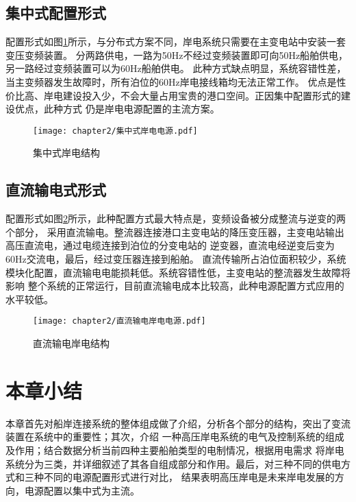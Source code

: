 \subsection{集中式配置形式}

配置形式如图\ref{fig:集中式岸电结构}所示，与分布式方案不同，岸电系统只需要在主变电站中安装一套变压变频装置。
分两路供电，一路为50Hz不经过变频装置即可向50Hz船舶供电，另一路经过变频装置可以为60Hz船舶供电。
此种方式缺点明显，系统容错性差，当主变频器发生故障时，所有泊位的60Hz岸电接线箱均无法正常工作。
优点是性价比高、岸电建设投入少，不会大量占用宝贵的港口空间。正因集中配置形式的建设优点，此种方式
仍是岸电电源配置的主流方案。

\begin{figure}[!htp]
	\centering
	\texttt{[image: chapter2/集中式岸电电源.pdf]}
	\caption{集中式岸电结构}
	\label{fig:集中式岸电结构}
\end{figure}

\subsection{直流输电式形式}

配置形式如图\ref{fig:直流输电岸电结构}所示，此种配置方式最大特点是，变频设备被分成整流与逆变的两个部分，
采用直流输电。整流器连接港口主变电站的降压变压器，主变电站输出高压直流电，通过电缆连接到泊位的分变电站的
逆变器，直流电经逆变后变为60Hz交流电，最后，经过变压器连接到船舶。
直流传输所占泊位面积较少，系统模块化配置，直流输电电能损耗低。系统容错性低，主变电站的整流器发生故障将影响
整个系统的正常运行，目前直流输电成本比较高，此种电源配置方式应用的水平较低。

\begin{figure}[!htp]
	\centering
	\texttt{[image: chapter2/直流输电岸电电源.pdf]}
	\caption{直流输电岸电结构}
	\label{fig:直流输电岸电结构}
\end{figure}

\section{本章小结}

本章首先对船岸连接系统的整体组成做了介绍，分析各个部分的结构，突出了变流装置在系统中的重要性；其次，介绍
一种高压岸电系统的电气及控制系统的组成及作用；结合数据分析当前四种主要船舶类型的电制情况，根据用电需求
将岸电系统分为三类，并详细叙述了其各自组成部分和作用。最后，对三种不同的供电方式和三种不同的电源配置形式进行对比，
结果表明高压岸电是未来岸电发展的方向，电源配置以集中式为主流。

